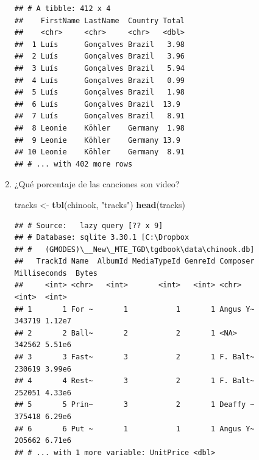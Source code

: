 \documentclass[]{book}
\newenvironment{Shaded}{\begin{snugshade}}{\end{snugshade}}
\newcommand{\KeywordTok}[1]{\textcolor[rgb]{0.13,0.29,0.53}{\textbf{#1}}}
\newcommand{\DataTypeTok}[1]{\textcolor[rgb]{0.13,0.29,0.53}{#1}}
\newcommand{\StringTok}[1]{\textcolor[rgb]{0.31,0.60,0.02}{#1}}
\newcommand{\OperatorTok}[1]{\textcolor[rgb]{0.81,0.36,0.00}{\textbf{#1}}}
\newcommand{\NormalTok}[1]{#1}
\begin{document}
\begin{enumerate}
\begin{Shaded}
\end{Shaded}

\begin{verbatim}
## # A tibble: 412 x 4
##    FirstName LastName  Country Total
##    <chr>     <chr>     <chr>   <dbl>
##  1 Luís      Gonçalves Brazil   3.98
##  2 Luís      Gonçalves Brazil   3.96
##  3 Luís      Gonçalves Brazil   5.94
##  4 Luís      Gonçalves Brazil   0.99
##  5 Luís      Gonçalves Brazil   1.98
##  6 Luís      Gonçalves Brazil  13.9 
##  7 Luís      Gonçalves Brazil   8.91
##  8 Leonie    Köhler    Germany  1.98
##  9 Leonie    Köhler    Germany 13.9 
## 10 Leonie    Köhler    Germany  8.91
## # ... with 402 more rows
\end{verbatim}
\item
  ¿Qué porcentaje de las canciones son video?

\begin{Shaded}
\begin{Highlighting}[]
\NormalTok{tracks <-}\StringTok{ }\KeywordTok{tbl}\NormalTok{(chinook, }\StringTok{"tracks"}\NormalTok{)}
\KeywordTok{head}\NormalTok{(tracks) }
\end{Highlighting}
\end{Shaded}

\begin{verbatim}
## # Source:   lazy query [?? x 9]
## # Database: sqlite 3.30.1 [C:\Dropbox
## #   (GMODES)\__New\_MTE_TGD\tgdbook\data\chinook.db]
##   TrackId Name  AlbumId MediaTypeId GenreId Composer Milliseconds  Bytes
##     <int> <chr>   <int>       <int>   <int> <chr>           <int>  <int>
## 1       1 For ~       1           1       1 Angus Y~       343719 1.12e7
## 2       2 Ball~       2           2       1 <NA>           342562 5.51e6
## 3       3 Fast~       3           2       1 F. Balt~       230619 3.99e6
## 4       4 Rest~       3           2       1 F. Balt~       252051 4.33e6
## 5       5 Prin~       3           2       1 Deaffy ~       375418 6.29e6
## 6       6 Put ~       1           1       1 Angus Y~       205662 6.71e6
## # ... with 1 more variable: UnitPrice <dbl>
\end{verbatim}

\begin{Shaded}
\end{Shaded}


\end{enumerate}
\end{document}
